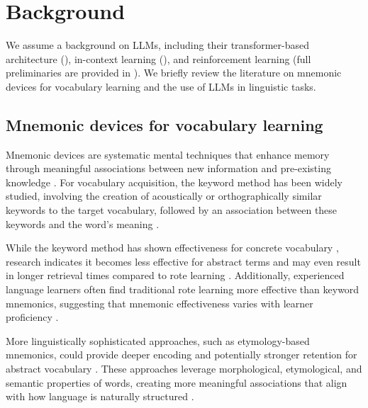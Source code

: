 \section{Background} \label{sec:background}

We assume a background on LLMs, including their transformer-based architecture (), in-context learning (), and reinforcement learning (full preliminaries are provided in ). We briefly review the literature on mnemonic devices for vocabulary learning and the use of LLMs in linguistic tasks.

\subsection{Mnemonic devices for vocabulary learning} \label{sec:mnemonic-review}


Mnemonic devices are systematic mental techniques that enhance memory through meaningful associations between new information and pre-existing knowledge \citep{PintrichROLE2002, pressleyMnemonicKeywordMethod1982}. For vocabulary acquisition, the keyword method has been widely studied, involving the creation of acoustically or orthographically similar keywords to the target vocabulary, followed by an association between these keywords and the word's meaning \citep{atkinsonApplicationMnemonicKeyword1975, wangKeywordMnemonicRetention1992}.

While the keyword method has shown effectiveness for concrete vocabulary \citep{avilaExploringNewApplications1996, camposImportanceKeywordGenerationMethod2004a}, research indicates it becomes less effective for abstract terms \citep{fothMnemonicTechniqueEffectiveness1973, CamposLIMITATIONS2003} and may even result in longer retrieval times compared to rote learning \citep{vanhellKeywordMnemonicsRote1997}. Additionally, experienced language learners often find traditional rote learning more effective than keyword mnemonics, suggesting that mnemonic effectiveness varies with learner proficiency \citep{vanhellKeywordMnemonicsRote1997, CamposUSING2011}.

More linguistically sophisticated approaches, such as etymology-based mnemonics, could provide deeper encoding and potentially stronger retention for abstract vocabulary \citep{piersonUsingEtymologyClassroom1989, akarslanEffectsTeachingWord2019, gangavarapuUsingEtymologyVocabulary2024}. These approaches leverage morphological, etymological, and semantic properties of words, creating more meaningful associations that align with how language is naturally structured \citep{zhangApplicationEtymologySemantic2013}.


